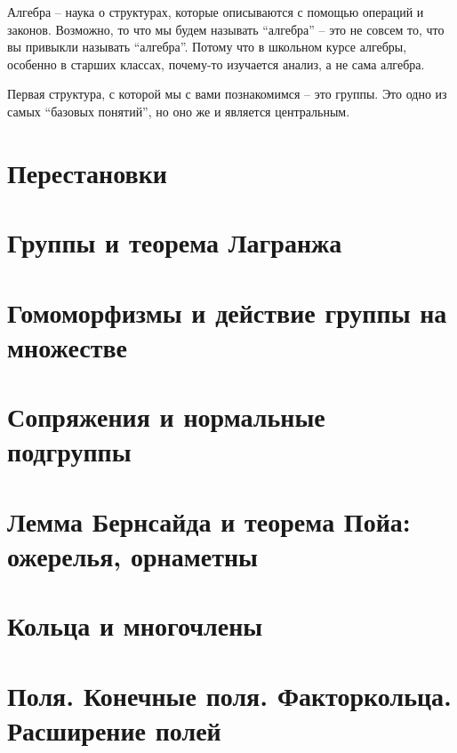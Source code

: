 \documentclass[10pt, twoside]{article}
\begin{document}
\pagestyle{empty}

\newpage

\tableofcontents
\newpage

\setcounter{page}{1}
\pagestyle{fancy}

Алгебра -- наука о структурах, которые описываются с помощью операций и законов. 
Возможно, то что мы будем называть ``алгебра'' -- это не совсем то, что вы привыкли называть ``алгебра''. 
Потому что в школьном курсе алгебры, особенно в старших классах, почему-то изучается анализ, а не сама алгебра.

Первая структура, с которой мы с вами познакомимся -- это группы.
Это одно из самых ``базовых понятий'', но оно же и является центральным. 












\newpage
\renewcommand{\thesection}{\roman{section}}
\setcounter{section}{0}

\section{Перестановки}

\section{Группы и теорема Лагранжа}

\section{Гомоморфизмы и действие группы на множестве}
%
\section{Сопряжения и нормальные подгруппы}
%
\section{Лемма Бернсайда и теорема Пойа: ожерелья, орнаметны}
%
\section{Кольца и многочлены}
%
\section{Поля. Конечные поля. Факторкольца. Расширение полей} %
%
%
\end{document}
